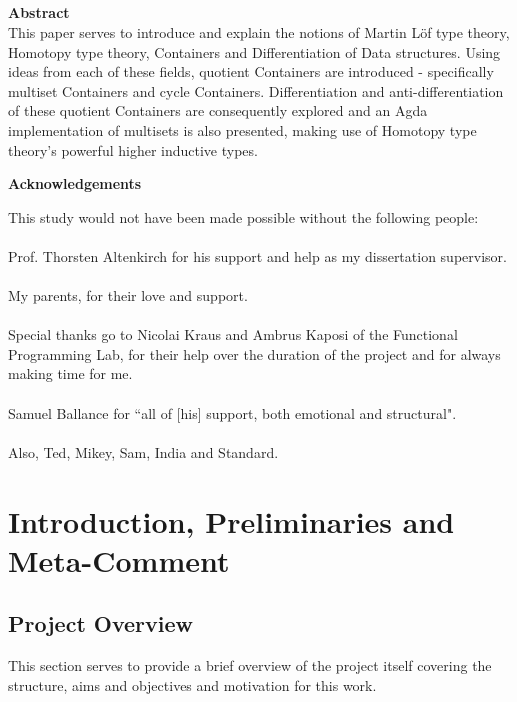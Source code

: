 \documentclass[12pt]{report}
\begin{document}
\setcounter{chapter}{-1}
\chapter{}
\Huge
\noindent \textbf{Abstract}\\

\normalsize
This paper serves to introduce and explain the notions of Martin L\"of type theory, Homotopy type theory, Containers and Differentiation of Data structures. Using ideas from each of these fields, quotient Containers are introduced - specifically multiset Containers and cycle Containers. Differentiation and anti-differentiation of these quotient Containers are consequently explored and an Agda implementation of multisets is also presented, making use of Homotopy type theory's powerful higher inductive types.


\Huge

\noindent \textbf{Acknowledgements}

\normalsize

This study would not have been made possible without the following people:\\
\\
Prof. Thorsten Altenkirch for his support and help as my dissertation supervisor.\\
\\
My parents, for their love and support.\\
\\
Special thanks go to Nicolai Kraus and Ambrus Kaposi of the Functional Programming Lab, for their help over the duration of the project and for always making time for me.\\
\\
Samuel Ballance for ``all of [his] support, both emotional and structural".
\\
\\
Also, Ted, Mikey, Sam, India and Standard.

\part{Introduction, Preliminaries and Meta-Comment}
\chapter{Project Overview}
This section serves to provide a brief overview of the project itself covering the structure, aims and objectives and motivation for this work. 
\end{document}
